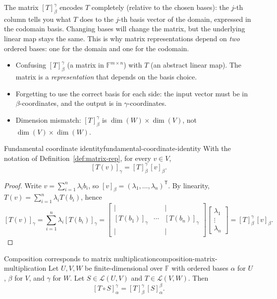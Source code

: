 The matrix $[T]^{\gamma}_{\beta}$ encodes $T$ completely (relative to the chosen bases): the $j$-th column tells you what $T$ does to the $j$-th basis vector of the domain, expressed in the codomain basis.
Changing bases will change the matrix, but the underlying linear map stays the same.
This is why matrix representations depend on \emph{two} ordered bases: one for the domain and one for the codomain.

\begin{commonmistake}
\begin{itemize}
\item Confusing $[T]^{\gamma}_{\beta}$ (a matrix in $\mathbb{F}^{m\times n}$) with $T$ (an abstract linear map). The matrix is a \emph{representation} that depends on the basis choice.
\item Forgetting to use the correct basis for each side: the input vector must be in $\beta$-coordinates, and the output is in $\gamma$-coordinates.
\item Dimension mismatch: $[T]^{\gamma}_{\beta}$ is $\dim(W)\times\dim(V)$, not $\dim(V)\times\dim(W)$.
\end{itemize}
\end{commonmistake}

\begin{theorem}{Fundamental coordinate identity}{fundamental-coordinate-identity}
With the notation of Definition~\ref{def:matrix-rep}, for every $v\in V$,
\[
[T(v)]_\gamma = [T]^{\gamma}_{\beta}\,[v]_\beta.
\]
\end{theorem}

\begin{proof}
Write $v=\sum_{i=1}^n \lambda_i b_i$, so $[v]_\beta=(\lambda_1,\dots,\lambda_n)^{\mathsf T}$.
By linearity, $T(v)=\sum_{i=1}^n \lambda_i T(b_i)$, hence
\[
[T(v)]_\gamma=\sum_{i=1}^n \lambda_i [T(b_i)]_\gamma
=
\begin{bmatrix}
\big| &        & \big|\\
[T(b_1)]_\gamma & \cdots & [T(b_n)]_\gamma\\
\big| &        & \big|
\end{bmatrix}
\begin{bmatrix}\lambda_1\\ \vdots\\ \lambda_n\end{bmatrix}
=[T]^{\gamma}_{\beta}\,[v]_\beta.
\]
\end{proof}

\begin{theorem}{Composition corresponds to matrix multiplication}{composition-matrix-multiplication}
Let $U,V,W$ be finite-dimensional over $\mathbb{F}$ with ordered bases
$\alpha$ for $U$, $\beta$ for $V$, and $\gamma$ for $W$.
Let $S\in\mathcal{L}(U,V)$ and $T\in\mathcal{L}(V,W)$. Then
\[
[T\circ S]^{\gamma}_{\alpha} = [T]^{\gamma}_{\beta}\,[S]^{\beta}_{\alpha}.
\]
\end{theorem}

